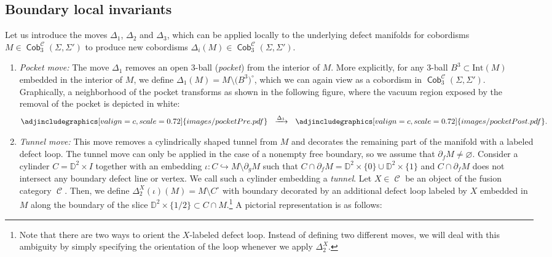 \documentclass[pdftex]{sigma}
\DeclareMathOperator{\Cob}{\mathsf{Cob}}
\DeclareMathOperator{\calc}{\mathcal{C}}
\numberwithin{equation}{section}
\theoremstyle{definition}
\begin{document}
\subsection{Boundary local invariants}
\label{subSecChar}
Let us introduce the moves $\Delta_1$, $\Delta_2$ and $\Delta_3$, which can be applied locally to the underlying defect manifolds for cobordisms $M \in \Cob_3^{\mathcal{C}}(\Sigma, \Sigma')$ to produce new cobordisms $\Delta_i(M) \in \Cob_3^{\mathcal{C}}(\Sigma, \Sigma')$.
\begin{enumerate}\itemsep=0pt
 \item \textit{Pocket move:} The move $\Delta_1$ removes an open 3-ball (\textit{pocket}) from the interior of $M$. More explicitly, for any 3-ball $B^3 \subset \mathrm{Int}(M) $ embedded in the interior of $M$, we define $\Delta_1(M) = M\setminus \bigl(B^3\bigr)^{\circ}$, which we can again view as a cobordism in $\Cob_3^{\mathcal{C}}(\Sigma, \Sigma')$. Graphically, a neighborhood of the pocket transforms as shown in the following figure, where the vacuum region exposed by the removal of the pocket is depicted in white:
 \begin{align*}
 \adjincludegraphics[valign=c, scale = 0.72]{images/pocketPre.pdf} \, \,\, \, \xrightarrow{\Delta_1} \,\,\,\,\adjincludegraphics[valign=c, scale = 0.72]{images/pocketPost.pdf}.
 \end{align*}
 \item \textit{Tunnel move:} This move removes a cylindrically shaped tunnel from $M$ and decorates the remaining part of the manifold with a labeled defect loop. The tunnel move can only be applied in the case of a nonempty free boundary, so we assume that $\partial_f M \neq \varnothing$. Consider a cylinder $C = \mathbb{D}^2 \times I$ together with an embedding $\iota\colon C \hookrightarrow M\setminus \partial_gM$ such that $C \cap \partial_f M = \mathbb{D}^2 \times \{0\} \cup \mathbb{D}^2 \times \{1\}$ and $C \cap \partial_f M$ does not intersect any boundary defect line or vertex. We call such a cylinder embedding a \textit{tunnel}. Let $X \in \calc$ be an object of the fusion category $\calc$. Then, we define $\Delta_2^X(\iota)(M) = M \setminus C^{\circ}$ with boundary decorated by an additional defect loop labeled by $X$ embedded in $M$ along the boundary of the slice $\mathbb{D}^2 \times \{1/2\} \subset C \cap M$.\footnote{Note that there are two ways to orient the $X$-labeled defect loop. Instead of defining two different moves, we will deal with this ambiguity by simply specifying the orientation of the loop whenever we apply $\Delta_2^X$.\label{footOrAmb}} A pictorial representation is as follows:

\end{enumerate}
\end{document}
